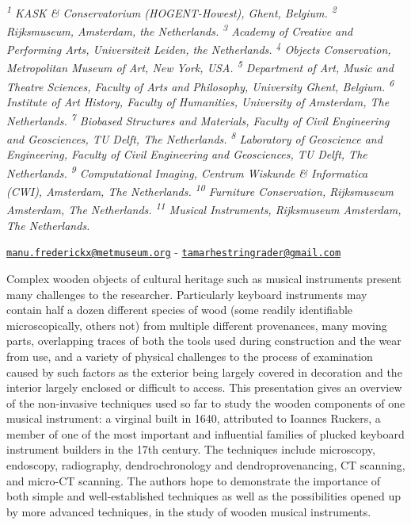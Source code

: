 \documentclass[
]{book}
\begin{document}
\emph{\textsuperscript{1} KASK \& Conservatorium (HOGENT-Howest), Ghent, Belgium. \textsuperscript{2} Rijksmuseum, Amsterdam, the Netherlands. \textsuperscript{3} Academy of Creative and Performing Arts, Universiteit Leiden, the Netherlands. \textsuperscript{4} Objects Conservation, Metropolitan Museum of Art, New York, USA. \textsuperscript{5} Department of Art, Music and Theatre Sciences, Faculty of Arts and Philosophy, University Ghent, Belgium. \textsuperscript{6} Institute of Art History, Faculty of Humanities, University of Amsterdam, The Netherlands. \textsuperscript{7} Biobased Structures and Materials, Faculty of Civil Engineering and Geosciences, TU Delft, The Netherlands. \textsuperscript{8} Laboratory of Geoscience and Engineering, Faculty of Civil Engineering and Geosciences, TU Delft, The Netherlands. \textsuperscript{9} Computational Imaging, Centrum Wiskunde \& Informatica (CWI), Amsterdam, The Netherlands. \textsuperscript{10} Furniture Conservation, Rijksmuseum Amsterdam, The Netherlands. \textsuperscript{11} Musical Instruments, Rijksmuseum Amsterdam, The Netherlands.}

\href{mailto:manu.frederickx@metmuseum.org}{\nolinkurl{manu.frederickx@metmuseum.org}} - \href{mailto:tamarhestringrader@gmail.com}{\nolinkurl{tamarhestringrader@gmail.com}}

Complex wooden objects of cultural heritage such as musical instruments present many challenges to the researcher. Particularly keyboard instruments may contain half a dozen different species of wood (some readily identifiable microscopically, others not) from multiple different provenances, many moving parts, overlapping traces of both the tools used during construction and the wear from use, and a variety of physical challenges to the process of examination caused by such factors as the exterior being largely covered in decoration and the interior largely enclosed or difficult to access. This presentation gives an overview of the non-invasive techniques used so far to study the wooden components of one musical instrument: a virginal built in 1640, attributed to Ioannes Ruckers, a member of one of the most important and influential families of plucked keyboard instrument builders in the 17th century. The techniques include microscopy, endoscopy, radiography, dendrochronology and dendroprovenancing, CT scanning, and micro-CT scanning. The authors hope to demonstrate the importance of both simple and well-established techniques as well as the possibilities opened up by more advanced techniques, in the study of wooden musical instruments.
\end{document}
